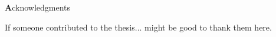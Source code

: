 \clearemptydoublepage
{}
{}	



\vspace*{2cm}

\begin{center}
{\Large \textbf Acknowledgments}
\end{center}

\vspace{1cm}


If someone contributed to the thesis... might be good to thank them here.